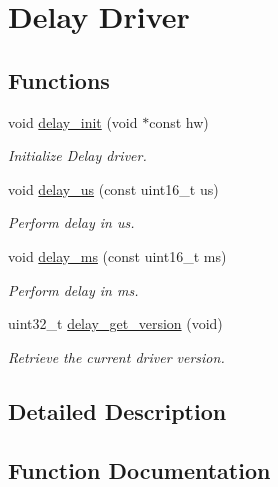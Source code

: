 \hypertarget{group__doc__driver__hal__delay}{}\section{Delay Driver}
\label{group__doc__driver__hal__delay}
\subsection*{Functions}
\begin{DoxyCompactItemize}
\item 
void \hyperlink{group__doc__driver__hal__delay_ga8f6bf53e286cef2eb222e9432a230836}{delay\+\_\+init} (void $\ast$const hw)
\begin{DoxyCompactList}\small\item\em Initialize Delay driver. \end{DoxyCompactList}\item 
void \hyperlink{group__doc__driver__hal__delay_gaa17c6e82a9085391c696904957505621}{delay\+\_\+us} (const uint16\+\_\+t us)
\begin{DoxyCompactList}\small\item\em Perform delay in us. \end{DoxyCompactList}\item 
void \hyperlink{group__doc__driver__hal__delay_gad2dd6e794004b50917d231195c324ce5}{delay\+\_\+ms} (const uint16\+\_\+t ms)
\begin{DoxyCompactList}\small\item\em Perform delay in ms. \end{DoxyCompactList}\item 
uint32\+\_\+t \hyperlink{group__doc__driver__hal__delay_gabb8969af264a11a3360634635244eca4}{delay\+\_\+get\+\_\+version} (void)
\begin{DoxyCompactList}\small\item\em Retrieve the current driver version. \end{DoxyCompactList}\end{DoxyCompactItemize}


\subsection{Detailed Description}


\subsection{Function Documentation}
\mbox{\label{group__doc__driver__hal__delay_gabb8969af264a11a3360634635244eca4}} 
